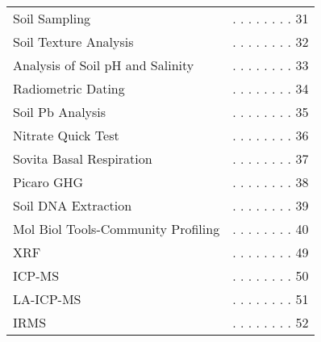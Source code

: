\documentclass[18pt]{memoir}\usepackage[]{graphicx}\usepackage[]{color}
\begin{document}
\begin{table}[ht]
\begin{tabular}{ll}
  Soil Sampling & . . . . . . . .  31 \\ 
  Soil Texture Analysis & . . . . . . . .  32 \\ 
  Analysis of Soil pH and Salinity & . . . . . . . .  33 \\ 
  Radiometric Dating & . . . . . . . .  34 \\ 
  Soil Pb Analysis & . . . . . . . .  35 \\ 
  Nitrate Quick Test & . . . . . . . .  36 \\ 
  Sovita Basal Respiration & . . . . . . . .  37 \\ 
  Picaro GHG & . . . . . . . .  38 \\ 
  Soil DNA Extraction & . . . . . . . .  39 \\ 
  Mol Biol Tools-Community Profiling & . . . . . . . .  40 \\ 
  XRF & . . . . . . . .  49 \\ 
  ICP-MS & . . . . . . . .  50 \\ 
  LA-ICP-MS & . . . . . . . .  51 \\ 
  IRMS & . . . . . . . .  52 \\ 
   \bottomrule
\end{tabular}
\end{table}
\end{document}
